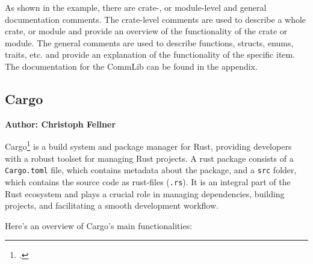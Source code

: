 As shown in the example, there are crate-, or module-level and general documentation comments. 
The crate-level comments are used to describe a whole crate, or module and provide an overview of the functionality of the crate or module.
The general comments are used to describe functions, structs, enums, traits, etc. and provide 
an explanation of the functionality of the specific item. The documentation for the CommLib can be found in the appendix.

\subsection{Cargo}
\textbf{Author: Christoph Fellner}

Cargo\footcite{cargo} is a build system and package manager for Rust, providing developers with a robust toolset for managing Rust projects. A rust package consists of a
\verb+Cargo.toml+ file, which contains metadata about the package, and a \verb+src+ folder, which contains the source code as rust-files (\verb+.rs+). It is an integral 
part of the Rust ecosystem and plays a crucial role in managing dependencies, building projects, and facilitating a smooth development workflow.

Here's an overview of Cargo's main functionalities:

